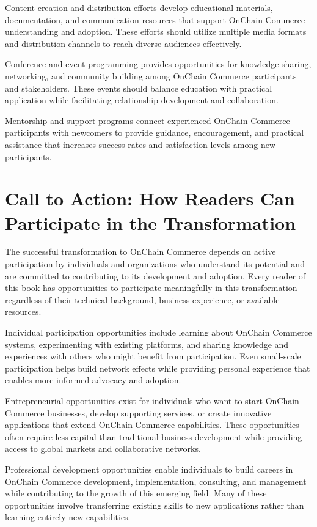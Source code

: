 \documentclass[
  Letterpaper,
]{scrbook}
\begin{document}
Content creation and distribution efforts develop educational materials,
documentation, and communication resources that support OnChain Commerce
understanding and adoption. These efforts should utilize multiple media
formats and distribution channels to reach diverse audiences
effectively.

Conference and event programming provides opportunities for knowledge
sharing, networking, and community building among OnChain Commerce
participants and stakeholders. These events should balance education
with practical application while facilitating relationship development
and collaboration.

Mentorship and support programs connect experienced OnChain Commerce
participants with newcomers to provide guidance, encouragement, and
practical assistance that increases success rates and satisfaction
levels among new participants.

\section{Call to Action: How Readers Can Participate in the
Transformation}\label{call-to-action-how-readers-can-participate-in-the-transformation}

The successful transformation to OnChain Commerce depends on active
participation by individuals and organizations who understand its
potential and are committed to contributing to its development and
adoption. Every reader of this book has opportunities to participate
meaningfully in this transformation regardless of their technical
background, business experience, or available resources.

Individual participation opportunities include learning about OnChain
Commerce systems, experimenting with existing platforms, and sharing
knowledge and experiences with others who might benefit from
participation. Even small-scale participation helps build network
effects while providing personal experience that enables more informed
advocacy and adoption.

Entrepreneurial opportunities exist for individuals who want to start
OnChain Commerce businesses, develop supporting services, or create
innovative applications that extend OnChain Commerce capabilities. These
opportunities often require less capital than traditional business
development while providing access to global markets and collaborative
networks.

Professional development opportunities enable individuals to build
careers in OnChain Commerce development, implementation, consulting, and
management while contributing to the growth of this emerging field. Many
of these opportunities involve transferring existing skills to new
applications rather than learning entirely new capabilities.
\end{document}
